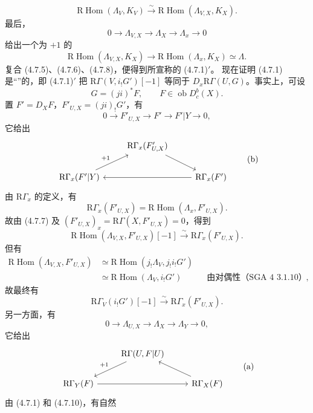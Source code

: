 \[
\mathrm R\operatorname{Hom}(\Lambda_V,K_V)\xrightarrow\sim\mathrm R\operatorname{Hom}(\Lambda_{V,X},K_X).\tag{4.7.6}
\]
最后，
\[
0\longrightarrow\Lambda_{V,X}\longrightarrow\Lambda_X\longrightarrow\Lambda_x\longrightarrow0\tag{4.7.7}
\]
给出一个为 $+1$ 的
\[
\mathrm R\operatorname{Hom}(\Lambda_{V,X},K_X)\longrightarrow\mathrm R\operatorname{Hom}(\Lambda_x,K_X)\simeq\Lambda.\tag{4.7.8}
\]
复合 (4.7.5)、(4.7.6)、(4.7.8)，便得到所宣称的 (4.7.1)$'$。
现在证明 (4.7.1) 是“”的，即 (4.7.1)$'$ 把 $\mathrm R\Gamma(V,i_!G')[-1]$ 等同于 $D_x\mathrm R\Gamma(U,G)$。事实上，可设
\[G=(ji)^*F,\qquad F\in\operatorname{ob}D_c^b(X).\]
置 $F'=D_XF$，$F'_{U,X}=(ji)_!G'$，有
\[
0\longrightarrow F'_{U,X}\longrightarrow F'\longrightarrow F'|Y\longrightarrow0,\tag{4.7.9}
\]
它给出
\[
\begin{tikzcd}
&\mathrm R\Gamma_x(F'_{U,X})\arrow[dr]\\
\mathrm R\Gamma_x(F'|Y)\arrow[ur,"{+1}"]&&\mathrm R\Gamma_x(F')\arrow[ll]
\end{tikzcd}\tag{b}
\]
由 $\mathrm R\Gamma_x$ 的定义，有
\[\mathrm R\Gamma_x(F'_{U,X})=\mathrm R\operatorname{Hom}(\Lambda_x,F'_{U,X}).\]
故由 (4.7.7) 及 $(F'_{U,X})_x=\mathrm R\Gamma(X,F'_{U,X})=0$，得到
\[
\mathrm R\operatorname{Hom}(\Lambda_{V,X},F'_{U,X})[-1]\xrightarrow\sim\mathrm R\Gamma_x(F'_{U,X}).
\]
但有
\[
\begin{aligned}
\mathrm R\operatorname{Hom}(\Lambda_{V,X},F'_{U,X})
&\simeq\mathrm R\operatorname{Hom}(j_!\Lambda_V,j_!i_!G')\\
&\simeq\mathrm R\operatorname{Hom}(\Lambda_V,i_!G')&&\text{由对偶性（SGA 4 3.1.10）},
\end{aligned}
\]
故最终有
\[
\mathrm R\Gamma_V(i_!G')[-1]\xrightarrow\sim\mathrm R\Gamma_x(F'_{U,X}).\tag{4.7.10}
\]
另一方面，有
\[
0\longrightarrow\Lambda_{U,X}\longrightarrow\Lambda_X\longrightarrow\Lambda_Y\longrightarrow0,\tag{4.7.11}
\]
它给出
\[
\begin{tikzcd}
&\mathrm R\Gamma(U,F|U)\arrow[dl,"{+1}"']\\
\mathrm R\Gamma_Y(F)\arrow[rr]&&\mathrm R\Gamma_X(F)\arrow[ul]
\end{tikzcd}\tag{a}
\]
由 (4.7.1) 和 (4.7.10)，有自然
